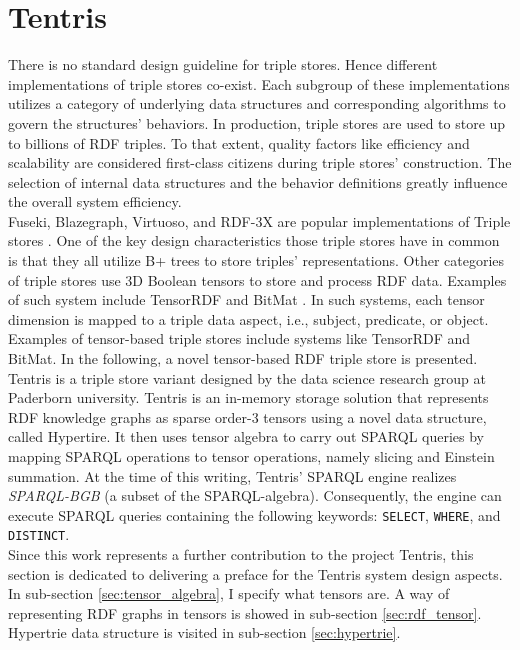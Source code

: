 \section{Tentris}
\label{sec:preliminaries:tentris}

There is no standard design guideline for triple stores. Hence different implementations of triple stores co-exist. Each subgroup of these implementations utilizes a category of underlying data structures and corresponding algorithms to govern the structures' behaviors. 
In production, triple stores are used to store up to billions of RDF triples. 
To that extent, quality factors like efficiency and scalability are considered first-class citizens during triple stores' construction. 
The selection of internal data structures and the behavior definitions greatly influence the overall system efficiency. \\

Fuseki, Blazegraph, Virtuoso, and RDF-3X are popular implementations of Triple stores \cite{fouc,SYS13,Erl,rdf3x}. 
One of the key design characteristics those triple stores have in common is that they all utilize B+ trees to store triples' representations. 
Other categories of triple stores use 3D Boolean tensors to store and process RDF data. Examples of such system include TensorRDF \cite{tensorrdf} and BitMat \cite{bitmat}. In such systems, each tensor dimension is mapped to a triple data aspect, i.e., subject, predicate, or object. Examples of tensor-based triple stores include systems like TensorRDF and BitMat. In the following, a novel tensor-based RDF triple store is presented. \\

Tentris is a triple store variant designed by the data science research group at Paderborn university\cite{tentris2020}. 
Tentris is an in-memory storage solution that represents RDF knowledge graphs as sparse order-3 tensors using a novel data structure, called Hypertire. 
It then uses tensor algebra to carry out SPARQL queries by mapping SPARQL operations to tensor operations, namely slicing and Einstein summation\cite{einstein}. 
At the time of this writing, Tentris' SPARQL engine realizes \textit{SPARQL-BGB}  (a subset of the SPARQL-algebra). 
Consequently, the engine can execute SPARQL queries containing the following keywords: \verb|SELECT|, \verb|WHERE|, and \verb|DISTINCT|\cite{Hitzler}. \\

Since this work represents a further contribution to the project Tentris, this section is dedicated to delivering a preface for the Tentris system design aspects. In sub-section \ref{sec:tensor_algebra}, I specify what tensors are. A way of representing RDF graphs in tensors is showed in sub-section \ref{sec:rdf_tensor}. Hypertrie data structure is visited in sub-section \ref{sec:hypertrie}.

